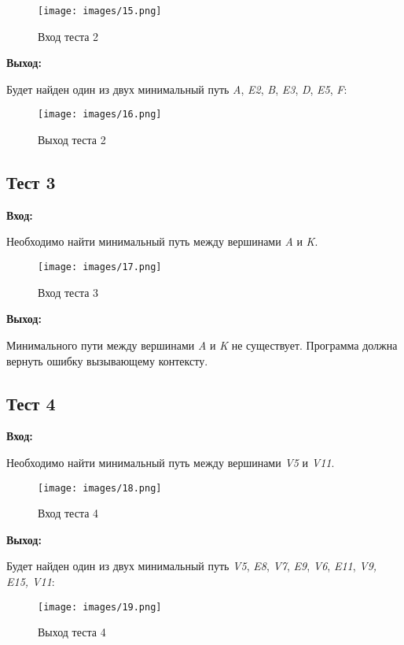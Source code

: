 \begin{figure}[H]
  \centering
  \texttt{[image: images/15.png]}
  \caption{Вход теста 2}
\end{figure}

\textbf{Выход:}

Будет найден один из двух минимальный путь \emph{A}, \emph{E2},
\emph{B}, \emph{E3}, \emph{D}, \emph{E5}, \emph{F}:

\begin{figure}[H]
  \centering
  \texttt{[image: images/16.png]}
  \caption{Выход теста 2}
\end{figure}

\subsection{Тест 3}

\textbf{Вход:}

Необходимо найти минимальный путь между вершинами \emph{A} и \emph{K}.

\begin{figure}[H]
  \centering
  \texttt{[image: images/17.png]}
  \caption{Вход теста 3}
\end{figure}

\textbf{Выход:}

Минимального пути между вершинами \emph{A} и \emph{K} не существует.
Программа должна вернуть ошибку вызывающему контексту.

\subsection{Тест 4}

\textbf{Вход:}

Необходимо найти минимальный путь между вершинами \emph{V5} и
\emph{V11}.

\begin{figure}[H]
  \centering
  \texttt{[image: images/18.png]}
  \caption{Вход теста 4}
\end{figure}

\textbf{Выход:}

Будет найден один из двух минимальный путь \emph{V5}, \emph{E8},
\emph{V7}, \emph{E9}, \emph{V6}, \emph{E11}, \emph{V9, E15, V11}:

\begin{figure}[H]
  \centering
  \texttt{[image: images/19.png]}
  \caption{Выход теста 4}
\end{figure}

